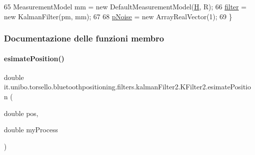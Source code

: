 \begin{DoxyCode}
65         MeasurementModel mm = \textcolor{keyword}{new} DefaultMeasurementModel(\hyperlink{classit_1_1unibo_1_1torsello_1_1bluetoothpositioning_1_1filters_1_1kalmanFilter2_1_1KFilter2_a4a7f02c99b3659ca45be7d0a336fe37b_a4a7f02c99b3659ca45be7d0a336fe37b}{H}, R);
66         \hyperlink{classit_1_1unibo_1_1torsello_1_1bluetoothpositioning_1_1filters_1_1kalmanFilter2_1_1KFilter2_a421a61f6c29cfad7a9faac33935a0b96_a421a61f6c29cfad7a9faac33935a0b96}{filter} = \textcolor{keyword}{new} KalmanFilter(pm, mm);
67 
68         \hyperlink{classit_1_1unibo_1_1torsello_1_1bluetoothpositioning_1_1filters_1_1kalmanFilter2_1_1KFilter2_a68fea74e8a3686178679321fd707835f_a68fea74e8a3686178679321fd707835f}{pNoise} = \textcolor{keyword}{new} ArrayRealVector(1);
69     \}
\end{DoxyCode}


\subsubsection{Documentazione delle funzioni membro}
\hypertarget{classit_1_1unibo_1_1torsello_1_1bluetoothpositioning_1_1filters_1_1kalmanFilter2_1_1KFilter2_a7cacbca71c01195a1ac7e00945d46f2f_a7cacbca71c01195a1ac7e00945d46f2f}{}\label{classit_1_1unibo_1_1torsello_1_1bluetoothpositioning_1_1filters_1_1kalmanFilter2_1_1KFilter2_a7cacbca71c01195a1ac7e00945d46f2f_a7cacbca71c01195a1ac7e00945d46f2f} 
\paragraph{\texorpdfstring{esimate\+Position()}{esimatePosition()}}
{\footnotesize\ttfamily double it.\+unibo.\+torsello.\+bluetoothpositioning.\+filters.\+kalman\+Filter2.\+K\+Filter2.\+esimate\+Position (\begin{DoxyParamCaption}\item[{double}]{pos,  }\item[{double}]{my\+Process }\end{DoxyParamCaption})}


